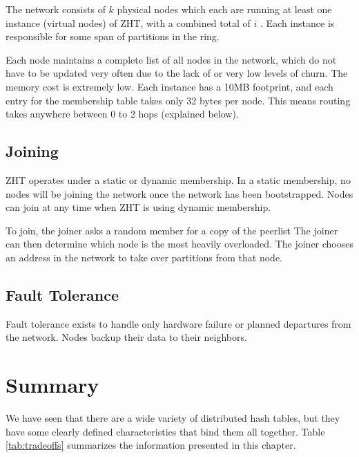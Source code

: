 The network consists of $k$ physical nodes which each are running at least one instance (virtual nodes) of ZHT, with a combined total of $i$ .
Each instance is responsible for some span of partitions in the ring.


Each node maintains a complete list of all nodes in the network, which do not have to be updated very often due to the lack of or very low levels of churn.
The memory cost is extremely low.
Each instance has a 10MB footprint, and each entry for the membership table takes only 32 bytes per node.
This means routing takes anywhere between 0 to 2 hops (explained below).

\subsection*{Joining}
ZHT operates under a static or dynamic membership.
In a static membership, no nodes will be joining the network once the network has been bootstrapped.
Nodes can join at any time when ZHT is using dynamic membership.

To join, the joiner asks a random member for a copy of the peerlist 
The joiner can then determine which node is the most heavily overloaded.
The joiner chooses an address in the network to take over partitions from that node.

\subsection*{Fault Tolerance}
Fault tolerance exists to handle only hardware failure or planned departures from the network.
Nodes backup their data to their neighbors.

\section{Summary}

We have seen that there are a wide variety of distributed hash tables, but they have some clearly defined characteristics that bind them all together.
Table \ref{tab:tradeoffs} summarizes the information presented in this chapter.


